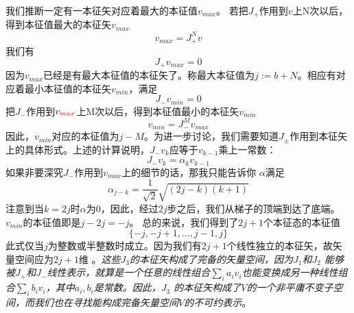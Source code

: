 我们推断一定有一本征矢对应着最大的本征值{{$v_{max}$}}。 若把$J_+$作用到$v$上N次以后，得到本征值最大的本征矢$v_{max}$
\begin{equation}\label{equ3.100}
  v_{max}=J_+^N v
\end{equation}
我们有
\begin{equation}\label{equ3.101}
  J_+v_{max}=0
\end{equation}
因为$v_{max}$已经是有最大本征值的本征矢了。称最大本征值为$j:=b+N$。相应有对应着最小本征值的本征矢$v_{min}$，满足
\begin{equation}\label{equ3.102}
  J_-v_{min}=0
\end{equation}
把$J_-$作用到$v_{\color{red}max}$上M次以后，得到本征值最小的本征矢$v_{min}$
\begin{equation}\label{equ3.103}
  v_{min}=J_-^M v_{max}
\end{equation}
因此，$v_{min}$对应的本征值为$j-M$。为进一步讨论，我们需要知道$J_\pm$作用到本征矢上的具体形式。上述的计算说明，$J_- v_k$应等于$v_{k-1}$乘上一常数：
\begin{equation}\label{equ3.104}
  J_- v_k=\alpha_k v_{k-1}
\end{equation}
如果非要深究$J_-$作用到$v_{max}$上的细节的话，那我只能告诉你
 $\alpha$满足
\begin{equation}\label{equ3.105}
  \alpha_{j-k}=\frac{1}{\sqrt{2}}\sqrt{(2j-k)(k+1)}
\end{equation}
注意到当$k=2j$时$\alpha$为0，因此，经过$2j$步之后，我们从梯子的顶端到达了底端。$v_{min}$的本征值即是$j-2j=-j$。 总的来说，我们得到了$2j+1$个本征态的本征值
\begin{equation}\label{equ3.106}
  \{-j,-j+1,\dots,j-1,j\}
\end{equation}
此式仅当$j$为整数或半整数时成立。因为我们有$2j+1$个线性独立的本征矢，故矢量空间应为$2j+1$维
。{\it{这些$J_3$的本征矢构成了完备的矢量空间，因为$J_1$和$J_2$ 能够被$J_+$和$J_-$线性表示，就算是一个任意的线性组合$\sum_i a_i v_i$也能变换成另一种线性组合$\sum_i b_i v_i$，其中$a_i ,b_i$是常数。因此，$J_3$ 的本征矢构成了$V$的一个非平庸不变子空间，而我们也在寻找能构成完备矢量空间$V$的不可约表示}}。

